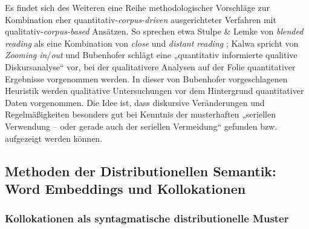 Es findet sich des Weiteren eine Reihe methodologischer Vorschläge zur Kombination eher quantitativ-\emph{corpus-driven} ausgerichteter Verfahren mit qualitativ-\emph{corpus-based} Ansätzen. So sprechen etwa Stulpe \& Lemke \autocite*{stulpeBlendedReading2016} von \emph{blended reading} als eine Kombination von \emph{close} und \emph{distant reading} \autocite{morettiConjecturesWorldLiterature2000}; Kalwa \autocite*{kalwaKonstitutionKonzeptenDiskursen2019} spricht von \emph{Zooming in}{\slash}\emph{out} und Bubenhofer \autocite*{bubenhoferQuantitativInformierteQualitative2013} schlägt eine „quantitativ informierte qualitive Diskursanalyse`` vor, bei der qualitativere Analysen auf der Folie quantitativer Ergebnisse vorgenommen werden. In dieser von Bubenhofer vorgeschlagenen Heuristik werden qualitative Untersuchungen vor dem Hintergrund quantitativer Daten vorgenommen. Die Idee ist, dass diskursive Veränderungen und Regelmäßigkeiten besonders gut bei Kenntnis der musterhaften „seriellen Verwendung -- oder gerade auch der seriellen Vermeidung`` \autocite*[130]{bubenhoferQuantitativInformierteQualitative2013} gefunden bzw. aufgezeigt werden können.

\subsection{Methoden der Distributionellen Semantik: Word Embeddings und Kollokationen}\label{methoden-der-distributionellen-semantik-word-embeddings-und-kollokationen}

\subsubsection{Kollokationen als syntagmatische distributionelle Muster}\label{kollokationen-als-syntagmatische-distributionelle-muster}

\label{was-sind-kollokationen}

